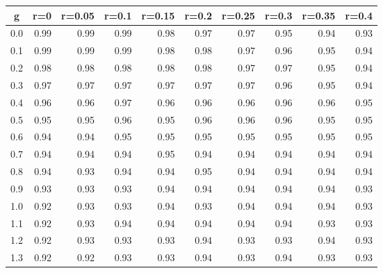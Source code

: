 %
\begin{table}[!tbp]
 \begin{center}
 \begin{tabular}{rrrrrrrrrr}\hline\hline
\multicolumn{1}{c}{g}&\multicolumn{1}{c}{r=0}&\multicolumn{1}{c}{r=0.05}&\multicolumn{1}{c}{r=0.1}&\multicolumn{1}{c}{r=0.15}&\multicolumn{1}{c}{r=0.2}&\multicolumn{1}{c}{r=0.25}&\multicolumn{1}{c}{r=0.3}&\multicolumn{1}{c}{r=0.35}&\multicolumn{1}{c}{r=0.4}\tabularnewline
\hline
0.0&0.99&0.99&0.99&0.98&0.97&0.97&0.95&0.94&0.93\tabularnewline
0.1&0.99&0.99&0.99&0.98&0.98&0.97&0.96&0.95&0.94\tabularnewline
0.2&0.98&0.98&0.98&0.98&0.98&0.97&0.97&0.95&0.94\tabularnewline
0.3&0.97&0.97&0.97&0.97&0.97&0.97&0.96&0.95&0.94\tabularnewline
0.4&0.96&0.96&0.97&0.96&0.96&0.96&0.96&0.96&0.95\tabularnewline
0.5&0.95&0.95&0.96&0.95&0.96&0.96&0.96&0.95&0.95\tabularnewline
0.6&0.94&0.94&0.95&0.95&0.95&0.95&0.95&0.95&0.95\tabularnewline
0.7&0.94&0.94&0.94&0.95&0.94&0.94&0.94&0.94&0.94\tabularnewline
0.8&0.94&0.93&0.94&0.94&0.95&0.94&0.94&0.94&0.94\tabularnewline
0.9&0.93&0.93&0.93&0.94&0.94&0.94&0.94&0.94&0.93\tabularnewline
1.0&0.92&0.93&0.93&0.94&0.93&0.94&0.94&0.94&0.93\tabularnewline
1.1&0.92&0.93&0.94&0.94&0.94&0.94&0.94&0.93&0.93\tabularnewline
1.2&0.92&0.93&0.93&0.93&0.94&0.93&0.93&0.94&0.93\tabularnewline
1.3&0.92&0.92&0.93&0.93&0.94&0.93&0.94&0.93&0.93\tabularnewline
\hline
\end{tabular}

\end{center}

\end{table}

